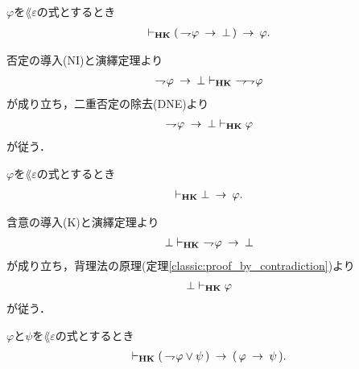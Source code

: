 	\begin{screen}
		\begin{thm}[背理法の原理]
		\label{classic:proof_by_contradiction}
			$\varphi$を$\lang{\varepsilon}$の式とするとき
			\begin{align}
				\vdash_{{\scriptsize \mbox{{\bf HK}}}} (\, \rightharpoondown\hspace{-0.25em} \varphi \hspace{0.25em}\rightarrow\hspace{0.25em} \bot\, )
				\hspace{0.25em}\rightarrow\hspace{0.25em} \varphi.
			\end{align}
		\end{thm}
	\end{screen}
	
	\begin{sketch}
		否定の導入(NI)と演繹定理より
		\begin{align}
			\negation \varphi \rarrow \bot \provable{\mbox{{\bf HK}}}\ 
			\negation \negation \varphi
		\end{align}
		が成り立ち，二重否定の除去(DNE)より
		\begin{align}
			\rightharpoondown\hspace{-0.25em} \varphi \hspace{0.25em}\rightarrow\hspace{0.25em} \bot \vdash_{{\scriptsize \mbox{{\bf HK}}}} \varphi
		\end{align}
		が従う．
		\QED
	\end{sketch}
	
	\begin{screen}
		\begin{thm}[爆発律]
		\label{classic:principle_of_explosion}
			$\varphi$を$\lang{\varepsilon}$の式とするとき
			\begin{align}
				\vdash_{{\scriptsize \mbox{{\bf HK}}}} \bot \hspace{0.25em}\rightarrow\hspace{0.25em} \varphi.
			\end{align}
		\end{thm}
	\end{screen}
	
	\begin{sketch}
		含意の導入(K)と演繹定理より
		\begin{align}
			\bot \vdash_{{\scriptsize \mbox{{\bf HK}}}}\ \rightharpoondown\hspace{-0.25em} \varphi \hspace{0.25em}\rightarrow\hspace{0.25em} \bot
		\end{align}
		が成り立ち，背理法の原理(定理\ref{classic:proof_by_contradiction})より
		\begin{align}
			\bot \vdash_{{\scriptsize \mbox{{\bf HK}}}} \varphi
		\end{align}
		が従う．
		\QED
	\end{sketch}
	
	\begin{screen}
		\begin{thm}[否定の論理和は含意で表せる]
		\label{classic:disjunction_of_negation_rewritable_by_implication}
			$\varphi$と$\psi$を$\lang{\varepsilon}$の式とするとき
			\begin{align}
				\vdash_{{\scriptsize \mbox{{\bf HK}}}} (\, \rightharpoondown\hspace{-0.25em} \varphi \vee \psi\, )
				\hspace{0.25em}\rightarrow\hspace{0.25em} (\, \varphi \hspace{0.25em}\rightarrow\hspace{0.25em} \psi\, ).
			\end{align}
		\end{thm}
	\end{screen}
	
